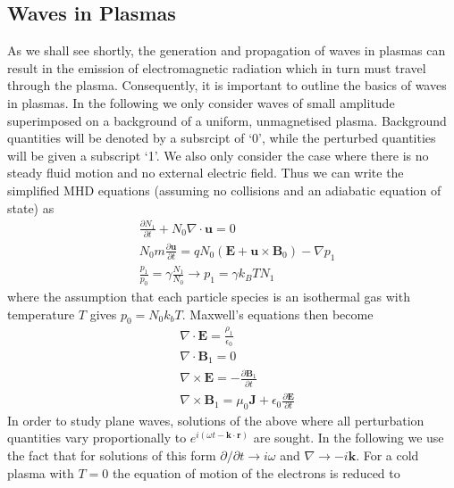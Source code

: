 \subsection{Waves in Plasmas}
As we shall see shortly, the generation and propagation of waves in plasmas can result in the emission of electromagnetic radiation which in turn must travel through the plasma. Consequently, it is important to outline the basics of waves in plasmas. In the following we only consider waves of small amplitude superimposed on a background of a uniform, unmagnetised plasma. Background quantities will be denoted by a subsrcipt of `0', while the perturbed quantities will be given a  subscript `1'. We also only consider the case where there is no steady fluid motion and no external electric field. Thus we can write the simplified MHD equations (assuming no collisions and an adiabatic equation of state) as
\begin{subequations} \label{eq:MHDwaves_simplified}
\begin{align}
& \frac{\partial N_1}{\partial t} + N_0 \nabla \cdot \mathbf{u} = 0 \\
& N_0 m \frac{\partial \mathbf{u}}{\partial t} = q N_0 (\mathbf{E} + \mathbf{u} \times \mathbf{B}_0) - \nabla p_1 \\
& \frac{p_1}{p_0} = \gamma \frac{N_1}{N_0} \rightarrow p_1 = \gamma k_B T N_1 
\end{align}
\end{subequations}
where the assumption that each particle species is an isothermal gas with temperature $T$ gives $p_0 = N_0 k_b T$. Maxwell's equations then become
\begin{subequations} \label{eq:MHDwaves_Maxwell}
\begin{align}
& \nabla \cdot \mathbf{E} = \frac{\rho_1}{\epsilon_0} \\
& \nabla \cdot \mathbf{B}_1 = 0 \\
& \nabla \times \mathbf{E} = - \frac{\partial \mathbf{B}_1}{\partial t} \\
& \nabla \times \mathbf{B}_1 = \mu_0 \mathbf{J} + \epsilon_0 \frac{\partial \mathbf{E}}{\partial t}
\end{align}
\end{subequations}
In order to study plane waves, solutions of the above where all perturbation quantities vary proportionally to  $e^{i(\omega t - \mathbf{k} \cdot \mathbf{r})}$ are sought. In the following we use the fact that for solutions of this form $\partial / \partial t \rightarrow i \omega$ and $\nabla \rightarrow -i \mathbf{k}$.  For a cold plasma with $T=0$ the equation of motion of the electrons is reduced to 

